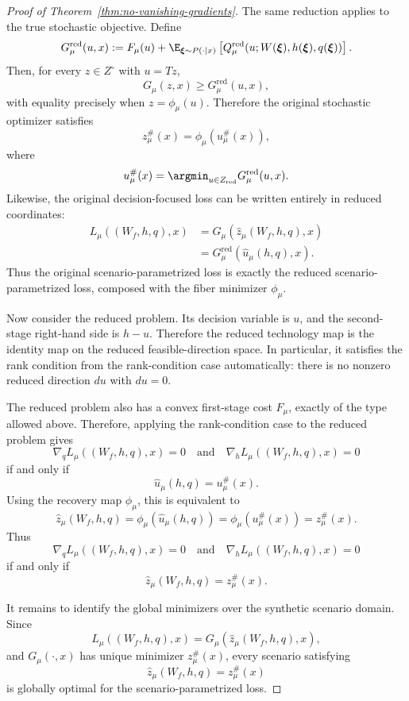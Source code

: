 \begin{proof}[Proof of Theorem~\ref{thm:no-vanishing-gradients}]
The same reduction applies to the true stochastic objective. Define
\[
G_\mu^{\mathrm{red}}(u,x)
:=
F_\mu(u)
+
\E_{\boldsymbol\xi\sim P(\cdot\mid x)}
\left[
Q_\mu^{\mathrm{red}}(u;W(\boldsymbol\xi),h(\boldsymbol\xi),q(\boldsymbol\xi))
\right].
\]
Then, for every $z\in Z^\circ$ with $u=Tz$,
\[
G_\mu(z,x)\geq G_\mu^{\mathrm{red}}(u,x),
\]
with equality precisely when $z=\phi_\mu(u)$. Therefore the original stochastic optimizer satisfies
\[
z_\mu^\#(x)=\phi_\mu(u_\mu^\#(x)),
\]
where
\[
u_\mu^\#(x)
=
\argmin_{u\in Z_{\mathrm{red}}}G_\mu^{\mathrm{red}}(u,x).
\]
Likewise, the original decision-focused loss can be written entirely in reduced coordinates:
\[
\begin{aligned}
L_\mu((W_f,h,q),x)
&=G_\mu(\hat z_\mu(W_f,h,q),x)\\
&=G_\mu^{\mathrm{red}}(\hat u_\mu(h,q),x).
\end{aligned}
\]
Thus the original scenario-parametrized loss is exactly the reduced scenario-parametrized loss, composed with the fiber minimizer $\phi_\mu$.

Now consider the reduced problem. Its decision variable is $u$, and the second-stage right-hand side is $h-u$. Therefore the reduced technology map is the identity map on the reduced feasible-direction space. In particular, it satisfies the rank condition from the rank-condition case automatically: there is no nonzero reduced direction $du$ with $du=0$.

The reduced problem also has a convex first-stage cost $F_\mu$, exactly of the type allowed above. Therefore, applying the rank-condition case to the reduced problem gives
\[
\nabla_q L_\mu((W_f,h,q),x)=0
\quad\text{and}\quad
\nabla_h L_\mu((W_f,h,q),x)=0
\]
if and only if
\[
\hat u_\mu(h,q)=u_\mu^\#(x).
\]
Using the recovery map $\phi_\mu$, this is equivalent to
\[
\hat z_\mu(W_f,h,q)
=
\phi_\mu(\hat u_\mu(h,q))
=
\phi_\mu(u_\mu^\#(x))
=
z_\mu^\#(x).
\]
Thus
\[
\nabla_q L_\mu((W_f,h,q),x)=0
\quad\text{and}\quad
\nabla_h L_\mu((W_f,h,q),x)=0
\]
if and only if
\[
\hat z_\mu(W_f,h,q)=z_\mu^\#(x).
\]

It remains to identify the global minimizers over the synthetic scenario domain. Since
\[
L_\mu((W_f,h,q),x)
=
G_\mu(\hat z_\mu(W_f,h,q),x),
\]
and $G_\mu(\cdot,x)$ has unique minimizer $z_\mu^\#(x)$, every scenario satisfying
\[
\hat z_\mu(W_f,h,q)=z_\mu^\#(x)
\]
is globally optimal for the scenario-parametrized loss.


\end{proof}
